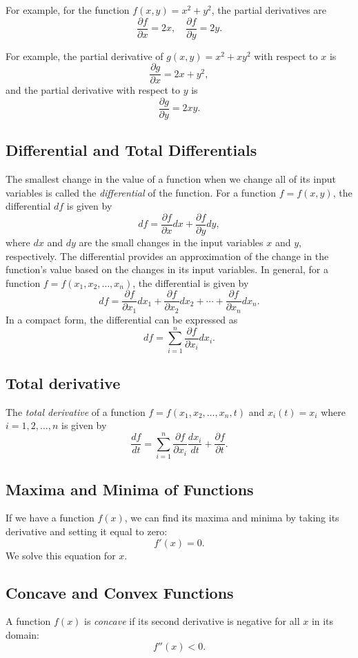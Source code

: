 \documentclass[../main.tex]{subfiles}
\begin{document}
For example, for the function \(f(x,y)=x^2+y^2\), the partial derivatives are
\[
\frac{\partial f}{\partial x} = 2x, \quad
\frac{\partial f}{\partial y} = 2y.
\]

For example, the partial derivative of \(g(x,y)=x^2+xy^2\) with respect to \(x\) is
\[
\frac{\partial g}{\partial x} = 2x+y^2,
\]
and the partial derivative with respect to \(y\) is
\[
\frac{\partial g}{\partial y} = 2xy.    
\]

\subsection{Differential and Total Differentials}
The smallest change in the value of a function when we change all of its input variables is called the \emph{differential} of the function. For a function $f=f(x,y)$, the differential \(df\) is given by
\[
df = \frac{\partial f}{\partial x}dx + \frac{\partial f}{\partial y}dy,
\]
where \(dx\) and \(dy\) are the small changes in the input variables \(x\) and \(y\), respectively. The differential provides an approximation of the change in the function's value based on the changes in its input variables. In general, for a function \(f=f(x_1,x_2,\hdots,x_n)\), the differential is given by
\[
df = \frac{\partial f}{\partial x_1}dx_1 + \frac{\partial f}{\partial x_2}dx_2 + \cdots + \frac{\partial f}{\partial x_n}dx_n.
\]  
In a compact form, the differential can be expressed as
\[
df = \sum_{i=1}^{n} \frac{\partial f}{\partial x_i}dx_i.
\]

\subsection{Total derivative}

The \emph{total derivative} of a function $f=f(x_1,x_2,\ldots,x_n,t)$ and $x_i(t)=x_i$ where $i=1,2,\ldots,n$ is given by
\[
\frac{df}{dt} = \sum_{i=1}^{n} \frac{\partial f}{\partial x_i}\frac{dx_i}{dt} + \frac{\partial f}{\partial t}.
\]

\subsection{Maxima and Minima of Functions}
If we have a function $f(x)$, we can find its maxima and minima by taking its derivative and setting it equal to zero:
\[
f'(x) = 0.
\]
We solve this equation for $x$.

\subsection{Concave and Convex Functions}
A function \(f(x)\) is \emph{concave} if its second derivative is negative for all \(x\) in its domain:
\[
f''(x) < 0.
\]
\end{document}

